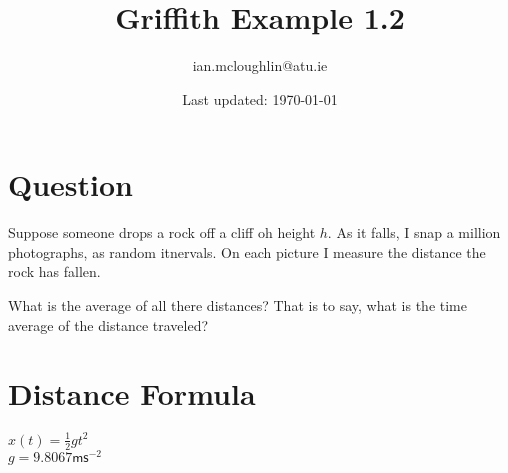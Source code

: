 \documentclass{iansnotes}
\title{Griffith Example 1.2}
\author{ian.mcloughlin@atu.ie}
\date{Last updated: \today}
\begin{document}
 
\maketitle

\section{Question}

Suppose someone drops a rock off a cliff oh height $h$.
As it falls, I snap a million photographs, as random itnervals.
On each picture I measure the distance the rock has fallen.

What is the average of all there distances?
That is to say, what is the time average of the distance traveled?\cite{griffiths2018}
 
\section{Distance Formula}
$x(t) = \frac{1}{2} gt^2$\\[4mm]
$g = 9.8067 \textsf{ms}^{-2}$\\[4mm]
\end{document}
